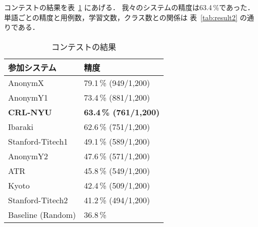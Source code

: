 コンテストの結果を表~\ref{tab:result} にあげる．
我々のシステムの精度は63.4\,\%であった．
単語ごとの精度と用例数，学習文数，クラス数との関係は
表~\ref{tab:result2} の通りである．

\begin{table}[htbp]
  \begin{center}
    \caption{コンテストの結果}
    \label{tab:result}
    \begin{tabular}[c]{|l|l|}
      \hline
      参加システム & 精度 \\
      \hline
      AnonymX & 79.1\,\% (949/1,200)\\
      AnonymY1 & 73.4\,\% (881/1,200)\\
      {\bf CRL-NYU} & {\bf 63.4\,\% (761/1,200)}\\
      Ibaraki & 62.6\,\% (751/1,200)\\
      Stanford-Titech1 & 49.1\,\% (589/1,200)\\
      AnonymY2 & 47.6\,\% (571/1,200)\\
      ATR & 45.8\,\% (549/1,200)\\
      Kyoto & 42.4\,\% (509/1,200)\\
      Stanford-Titech2 & 41.2\,\% (494/1,200)\\
      Baseline (Random) & 36.8\,\% \\
      \hline
    \end{tabular}
  \end{center}
\end{table}

